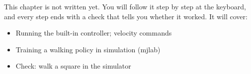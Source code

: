 \label{k:walk}
\begin{keyidea}
This chapter is not written yet. You will follow it step by step at the keyboard, and every step ends with a check that tells you whether it worked. It will cover:
\begin{itemize}[nosep]
  \item Running the built-in controller; velocity commands
  \item Training a walking policy in simulation (mjlab)
  \item Check: walk a square in the simulator
\end{itemize}
\end{keyidea}
